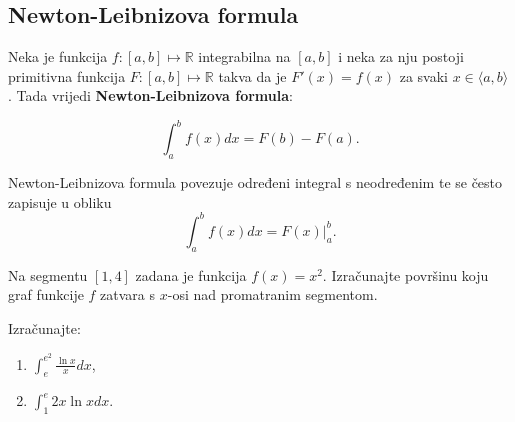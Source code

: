 \subsection{Newton-Leibnizova formula}

Neka je funkcija $f: [a,b] \mapsto \mathbb{R}$ integrabilna na $[a,b]$ i neka za nju postoji primitivna funkcija $F: [a,b] \mapsto \mathbb{R}$ takva da je $F'(x)=f(x)$ za svaki $x\in \langle a, b \rangle$. Tada vrijedi \textbf{Newton-Leibnizova formula}:

$$
  \int_a^b f(x)dx=F(b)-F(a).
$$

Newton-Leibnizova formula povezuje određeni integral s neodređenim te se često zapisuje u obliku
$$
  \int_a^b f(x)dx=F(x)\Big|_a^b.
$$

\begin{example}
    Na segmentu $[1,4]$ zadana je funkcija $f(x)=x^2$.
    Izračunajte površinu koju graf funkcije $f$ zatvara s $x$-osi nad promatranim segmentom.
\end{example}


\begin{example}
    Izračunajte:

    \begin{enumerate}
        \item $\displaystyle \int_e^{e^2} \frac{\ln x}{x} dx$,
        \item $\displaystyle \int_1^{e} 2x \ln x dx$.
    \end{enumerate}
\end{example}
